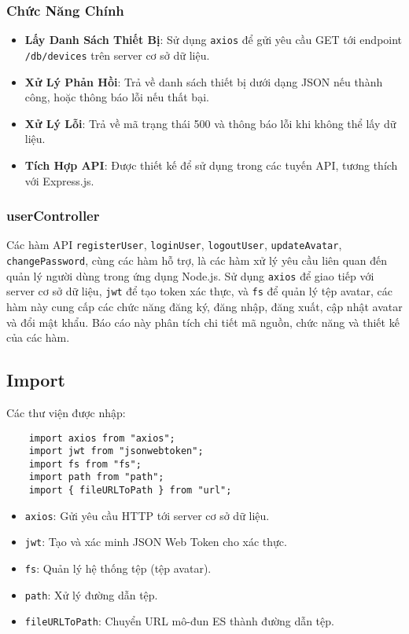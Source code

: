             \subsubsection{Chức Năng Chính}
                \begin{itemize}
                    \item \textbf{Lấy Danh Sách Thiết Bị}: Sử dụng \texttt{axios} để gửi yêu cầu GET tới endpoint \texttt{/db/devices} trên server cơ sở dữ liệu.
                    \item \textbf{Xử Lý Phản Hồi}: Trả về danh sách thiết bị dưới dạng JSON nếu thành công, hoặc thông báo lỗi nếu thất bại.
                    \item \textbf{Xử Lý Lỗi}: Trả về mã trạng thái 500 và thông báo lỗi khi không thể lấy dữ liệu.
                    \item \textbf{Tích Hợp API}: Được thiết kế để sử dụng trong các tuyến API, tương thích với Express.js.
                \end{itemize}
        \subsubsection{userController}
            \hspace*{0.6cm}Các hàm API \texttt{registerUser}, \texttt{loginUser}, \texttt{logoutUser}, \texttt{updateAvatar}, \texttt{changePassword}, cùng các hàm hỗ trợ, là các hàm xử lý yêu cầu liên quan đến quản lý người dùng trong ứng dụng Node.js. Sử dụng \texttt{axios} để giao tiếp với server cơ sở dữ liệu, \texttt{jwt} để tạo token xác thực, và \texttt{fs} để quản lý tệp avatar, các hàm này cung cấp các chức năng đăng ký, đăng nhập, đăng xuất, cập nhật avatar và đổi mật khẩu. Báo cáo này phân tích chi tiết mã nguồn, chức năng và thiết kế của các hàm. 
            \subsection{Import}
                \hspace*{0.6cm}Các thư viện được nhập:
                \begin{lstlisting}
    import axios from "axios";
    import jwt from "jsonwebtoken";
    import fs from "fs";
    import path from "path";
    import { fileURLToPath } from "url";
                \end{lstlisting}
                \begin{itemize}
                    \item \texttt{axios}: Gửi yêu cầu HTTP tới server cơ sở dữ liệu.
                    \item \texttt{jwt}: Tạo và xác minh JSON Web Token cho xác thực.
                    \item \texttt{fs}: Quản lý hệ thống tệp (tệp avatar).
                    \item \texttt{path}: Xử lý đường dẫn tệp.
                    \item \texttt{fileURLToPath}: Chuyển URL mô-đun ES thành đường dẫn tệp.
                \end{itemize}

